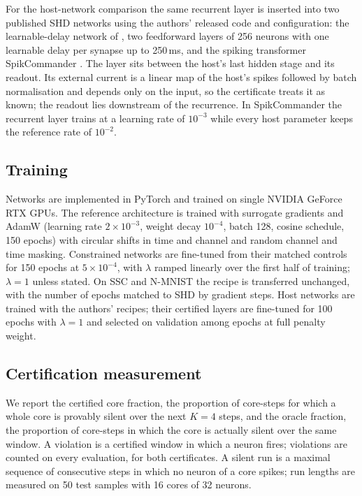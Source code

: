 \documentclass{iopjournal}
\begin{document}
For the host-network comparison the same recurrent layer is inserted into two published SHD networks using the authors' released code and configuration: the learnable-delay network of \cite{dcls}, two feedforward layers of 256 neurons with one learnable delay per synapse up to 250\,ms, and the spiking transformer SpikCommander \cite{spikcommander}. The layer sits between the host's last hidden stage and its readout. Its external current is a linear map of the host's spikes followed by batch normalisation and depends only on the input, so the certificate treats it as known; the readout lies downstream of the recurrence. In SpikCommander the recurrent layer trains at a learning rate of $10^{-3}$ while every host parameter keeps the reference rate of $10^{-2}$.

\subsection{Training}

Networks are implemented in PyTorch and trained on single NVIDIA GeForce RTX GPUs. The reference architecture is trained with surrogate gradients and AdamW (learning rate $2\times10^{-3}$, weight decay $10^{-4}$, batch 128, cosine schedule, 150 epochs) with circular shifts in time and channel and random channel and time masking. Constrained networks are fine-tuned from their matched controls for 150 epochs at $5\times10^{-4}$, with $\lambda$ ramped linearly over the first half of training; $\lambda=1$ unless stated. On SSC and N-MNIST the recipe is transferred unchanged, with the number of epochs matched to SHD by gradient steps. Host networks are trained with the authors' recipes; their certified layers are fine-tuned for 100 epochs with $\lambda=1$ and selected on validation among epochs at full penalty weight.

\subsection{Certification measurement}

We report the certified core fraction, the proportion of core-steps for which a whole core is provably silent over the next $K=4$ steps, and the oracle fraction, the proportion of core-steps in which the core is actually silent over the same window. A violation is a certified window in which a neuron fires; violations are counted on every evaluation, for both certificates. A silent run is a maximal sequence of consecutive steps in which no neuron of a core spikes; run lengths are measured on 50 test samples with 16 cores of 32 neurons.
\end{document}
